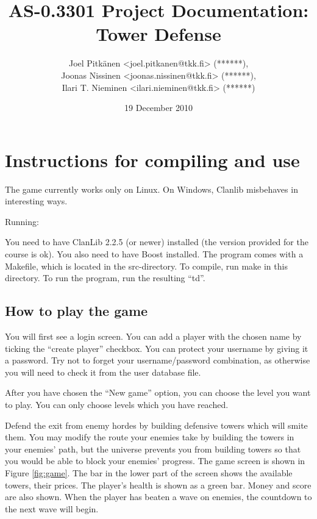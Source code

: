 \documentclass[11pt]{article}
\title{AS-0.3301 Project Documentation: Tower Defense}
\author{Joel Pitkänen <joel.pitkanen@tkk.fi> (******),\\ Joonas Nissinen <joonas.nissinen@tkk.fi> (******),\\ Ilari T. Nieminen <ilari.nieminen@tkk.fi> (******)}
\date{19 December 2010}
\begin{document}
\maketitle

\setcounter{tocdepth}{3}
\tableofcontents
\vspace*{1cm}

\section{Instructions for compiling and use}
\label{sec-1}


The game currently works only on Linux. On Windows, Clanlib misbehaves in interesting ways.

Running:

You need to have ClanLib 2.2.5 (or newer) installed (the version
provided for the course is ok). You also need to have Boost
installed. The program comes with a Makefile, which is located in the
src-directory. To compile, run make in this directory. To run the
program, run the resulting ``td''.

\subsection{How to play the game}
\label{sec-1_1}

You will first see a login screen. You can add a player with the
chosen name by ticking the ``create player'' checkbox. You can protect
your username by giving it a password. Try not to forget your
username/password combination, as otherwise you will need to check it
from the user database file.

After you have chosen the ``New game'' option, you can choose the level
you want to play. You can only choose levels which you have reached.

Defend the exit from enemy hordes by building defensive towers which
will smite them. You may modify the route your enemies take by
building the towers in your enemies' path, but the universe prevents
you from building towers so that you would be able to block your
enemies' progress. The game screen is shown in Figure
\ref{fig:game}. The bar in the lower part of the screen shows the
available towers, their prices. The player's health is shown as a
green bar. Money and score are also shown. When the player has beaten
a wave on enemies, the countdown to the next wave will begin.
\end{document}
